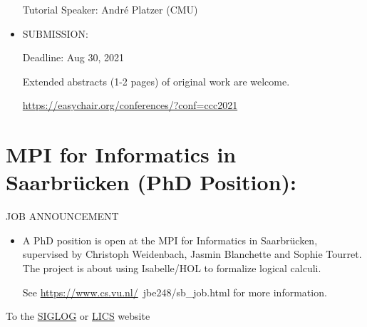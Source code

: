\documentclass[prodmode,acmtecs]{acmsmall} %
\begin{document}
\begin{itemize}
  Tutorial Speaker: André Platzer (CMU) 
 
\item  SUBMISSION:  
 
Deadline: Aug 30, 2021 
 
  Extended abstracts (1-2 pages) of original work are welcome. 
 
  \href{https://easychair.org/conferences/?conf=ccc2021}{https://easychair.org/conferences/?conf=ccc2021} 
 
\end{itemize}\section{MPI for Informatics in Saarbrücken (PhD Position):}\label{MPIforInformaticsinSaarbrckenPhDPosition}JOB ANNOUNCEMENT 

\begin{itemize}\item  A PhD position is open at the MPI for Informatics in Saarbrücken, supervised by Christoph Weidenbach, Jasmin Blanchette and Sophie Tourret. The project is about using Isabelle/HOL to formalize logical calculi. 
 
  See \href{https://www.cs.vu.nl/}{https://www.cs.vu.nl/}~jbe248/sb\_job.html for more information. 
 
\end{itemize}


To the \href{http://siglog.org/}{SIGLOG} or \href{https://lics.siglog.org}{LICS} website
\end{document}
